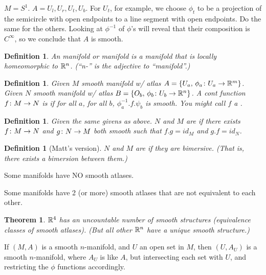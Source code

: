 \documentclass[11pt]{amsbook}
\theoremstyle{mystyle} %
\newtheorem{thrm}[thm]{Theorem}
\newtheorem{defi}[thm]{Definition}
\numberwithin{thm}{section}
\begin{document}
\begin{example}
	$M = S^1$.  $A = {U_l, U_r, U_t, U_b}$.  For $U_t$, for example, we choose $\phi_t$ to be a projection of the semicircle with open endpoints to a line segment with open endpoints.  Do the same for the others.  Looking at $\phi^{-1}$ of $\phi$'s will reveal that their composition is $C^\infty$, so we conclude that $A$ is smooth.
\end{example}

\begin{defi}
	An manifold or  manifold is a manifold that is locally homeomorphic to ${\mathbb R}^n$.  (``n-'' is the adjective to ``manifold''.)
\end{defi}


\begin{defi}
	Given $M$ smooth manifold w/ atlas $A = \{ U_a, \,  \phi_a \colon U_a \to {\mathbb R}^m \}$.
	Given $N$ smooth manifold w/ atlas $B = \{ O_b, \,  \phi_b \colon U_b \to {\mathbb R}^n \}$.
	A cont function $f \colon M \to N$ is  if for all $a$, for all $b$, $\phi_a^{-1}.f.\psi_b$ is smooth.  You might call $f$ a .
\end{defi}
\begin{defi}
	Given the same givens as above.
	$N$ and $M$ are  if there exists $f \colon M \to N$ and $g \colon N \to M$ both smooth such that $f.g = id_M$ and $g.f = id_N$.
\end{defi}
\begin{defi}[Matt's version]
	$N$ and $M$ are  if they are bimersive.  (That is, there exists a bimersion between them.)
\end{defi}

\begin{rmk}
	Some manifolds have NO smooth atlases.

	Some manifolds have 2 (or more) smooth atlases that are not equivalent to each other.
\end{rmk}


\begin{thrm}
	${\mathbb R}^4$ has an uncountable number of smooth structures (equivalence classes of smooth atlases).  (But all other ${\mathbb R}^n$ have a unique smooth structure.)
\end{thrm}

\begin{rmk}
	If $(M,A)$ is a smooth $n$-manifold, and $U$ an open set in $M$, then $(U,A_U)$ is a smooth $n$-manifold, where $A_U$ is like $A$, but intersecting each set with $U$, and restricting the $\phi$ functions accordingly.
\end{rmk}
\end{document}
